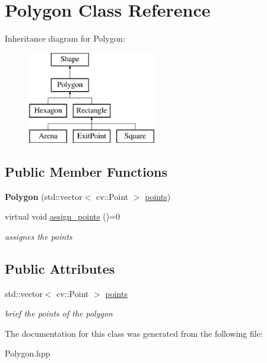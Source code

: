 \hypertarget{class_polygon}{}\section{Polygon Class Reference}
\label{class_polygon}
Inheritance diagram for Polygon\+:\begin{figure}[H]
\begin{center}
\leavevmode
\includegraphics[height=4.000000cm]{class_polygon}
\end{center}
\end{figure}
\subsection*{Public Member Functions}
\begin{DoxyCompactItemize}
\item 
\mbox{\label{class_polygon_ab64d7cd0303d3bf850a770a4553a03c2}} 
{\bfseries Polygon} (std\+::vector$<$ cv\+::\+Point $>$ \mbox{\hyperlink{class_polygon_a347474823f6113a34fdefeee276d1b9e}{points}})
\item 
\mbox{\label{class_polygon_ab2b986de126f57021357eb4bbf4d5c02}} 
virtual void \mbox{\hyperlink{class_polygon_ab2b986de126f57021357eb4bbf4d5c02}{assign\+\_\+points}} ()=0
\begin{DoxyCompactList}\small\item\em assignes the points \end{DoxyCompactList}\end{DoxyCompactItemize}
\subsection*{Public Attributes}
\begin{DoxyCompactItemize}
\item 
\mbox{\label{class_polygon_a347474823f6113a34fdefeee276d1b9e}} 
std\+::vector$<$ cv\+::\+Point $>$ \mbox{\hyperlink{class_polygon_a347474823f6113a34fdefeee276d1b9e}{points}}
\begin{DoxyCompactList}\small\item\em brief the points of the polygon \end{DoxyCompactList}\end{DoxyCompactItemize}


The documentation for this class was generated from the following file\+:\begin{DoxyCompactItemize}
\item 
Polygon.\+hpp\end{DoxyCompactItemize}
